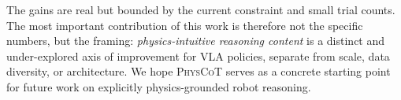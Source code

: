 \documentclass{article}
\newcommand{\physcot}{\textsc{PhysCoT}}
\begin{document}
The gains are real but bounded by the current constraint and small trial counts.
The most important contribution of this work is therefore not the specific numbers,
but the framing: \emph{physics-intuitive reasoning content} is a distinct and
under-explored axis of improvement for VLA policies, separate from
scale, data diversity, or architecture.
We hope \physcot{} serves as a concrete starting point for future work on
explicitly physics-grounded robot reasoning.




\end{document}
